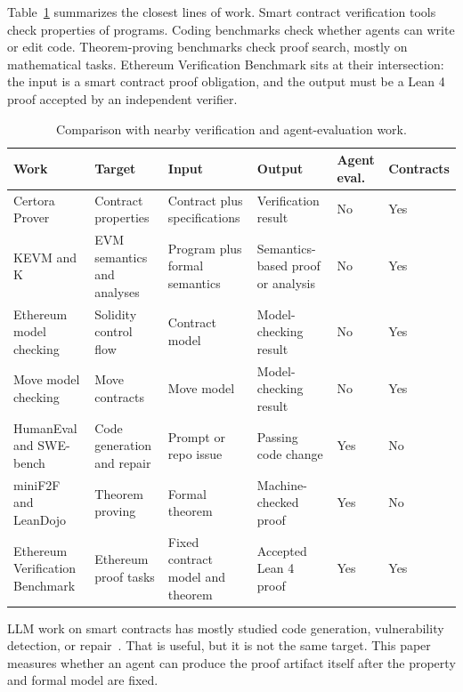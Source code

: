 \documentclass[conference]{IEEEtran}
\newcommand{\toolname}{Ethereum Verification Benchmark}
\newcommand{\lean}{Lean 4}
\begin{document}
Table~\ref{tab:related-comparison} summarizes the closest lines of work.
Smart contract verification tools check properties of programs. Coding
benchmarks check whether agents can write or edit code. Theorem-proving
benchmarks check proof search, mostly on mathematical tasks. \toolname{} sits
at their intersection: the input is a smart contract proof obligation, and the
output must be a \lean{} proof accepted by an independent verifier.

\begin{table}[t]
\caption{Comparison with nearby verification and agent-evaluation work.}
\label{tab:related-comparison}
\centering
\scriptsize
\setlength{\tabcolsep}{3pt}
\begin{tabular}{@{}p{}p{}p{}p{}p{}p{}@{}}
\toprule
Work & Target & Input & Output & Agent eval. & Contracts \\
\midrule
Certora Prover~\cite{certora} & Contract properties & Contract plus specifications & Verification result & No & Yes \\
KEVM and K~\cite{kframework,kevm} & EVM semantics and analyses & Program plus formal semantics & Semantics-based proof or analysis & No & Yes \\
Ethereum model checking~\cite{bang2020ethereum} & Solidity control flow & Contract model & Model-checking result & No & Yes \\
Move model checking~\cite{keilty2022move} & Move contracts & Move model & Model-checking result & No & Yes \\
HumanEval and SWE-bench~\cite{humaneval,swebench} & Code generation and repair & Prompt or repo issue & Passing code change & Yes & No \\
miniF2F and LeanDojo~\cite{minif2f,leandojo} & Theorem proving & Formal theorem & Machine-checked proof & Yes & No \\
\toolname{} & Ethereum proof tasks & Fixed contract model and theorem & Accepted \lean{} proof & Yes & Yes \\
\bottomrule
\end{tabular}
\end{table}

LLM work on smart contracts has mostly studied code generation, vulnerability
detection, or repair~\cite{napoli2024llmcontracts}. That is useful, but it is
not the same target. This paper measures whether an agent can produce the proof
artifact itself after the property and formal model are fixed.
\end{document}
